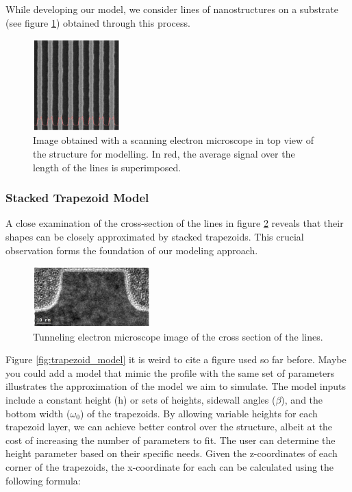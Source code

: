  \medskip

While developing our model, we consider lines of nanostructures on a substrate (see figure \ref{fig:lines}) obtained through this process.

\begin{figure}[h]
    \centering
    \includegraphics[width=0.3\textwidth]{images/lines_modeled.png}
    \caption{Image obtained with a scanning electron microscope in top view of the structure for modelling. 
    In red, the average signal over the length of the lines is superimposed.\cite{these_reche}}
    \label{fig:lines}
\end{figure}

\subsubsection{Stacked Trapezoid Model}

A close examination of the cross-section of the lines in figure \ref{fig:trapezoid} reveals that their shapes can be closely approximated by stacked trapezoids. This crucial observation forms the foundation of our modeling approach.

\medskip

\begin{figure}[h]
    \centering
    \includegraphics[width=0.4\textwidth]{images/trap_model.PNG}
    \caption{Tunneling electron microscope image of the cross section of the lines.\cite{phd_freychet}}
    \label{fig:trapezoid}
\end{figure}


Figure \ref{fig:trapezoid_model} \color{red} it is weird to cite a figure used so far before. Maybe you could add a model that mimic the profile with the same set of parameters \color{black} 
illustrates the approximation of the model we aim to simulate. 
The model inputs include a constant height (h) or sets of heights, sidewall angles ($\beta$), and the
bottom width ($\omega_{0}$) of the trapezoids. By allowing variable heights for each trapezoid layer, we can 
achieve better control over the structure, albeit at the cost of increasing the number of 
parameters to fit. The user can determine the height parameter based on their specific needs. 
Given the z-coordinates of each corner of the trapezoids, the x-coordinate for each can be 
calculated using the following formula:

